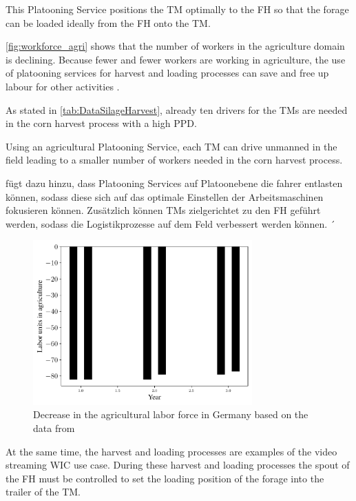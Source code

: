 This Platooning Service positions the \ac{TM} optimally to the \ac{FH} so that the forage can be loaded ideally from the \ac{FH} onto the \ac{TM}.


\autoref{fig:workforce_agri} shows that the number of workers in the agriculture domain is declining.  
Because fewer and fewer workers are working in agriculture, the use of platooning services for harvest and loading processes can save and free up labour for other activities \cite{liu_automation_2022}.

As stated in \autoref{tab:DataSilageHarvest}, already ten drivers for the \ac{TM}s are needed in the corn harvest process with a high \ac{PPD}. 

Using an agricultural Platooning Service, each \ac{TM} can drive unmanned in the field leading to a smaller number of workers needed in the corn harvest process.

\textcite{IVAN} fügt dazu hinzu, dass Platooning Services auf Platoonebene die fahrer entlasten können, sodass diese sich auf das optimale Einstellen der Arbeitsmaschinen fokusieren können. Zusätzlich können \ac{TM}s zielgerichtet zu den \ac{FH} geführt werden, sodass die Logistikprozesse auf dem Feld verbessert werden können. ´

\begin{figure}%
	\centering
	\includegraphics[width=0.75\textwidth]{figures/WorkForceAgriculture.pdf}
	\caption{Decrease in the agricultural labor force in Germany based on the data from \cite{bmel2020}}%
	\label{fig:workforce_agri}%
\end{figure}


At the same time, the harvest and loading processes are examples of the video streaming \ac{WIC} use case. During these harvest and loading processes the spout of the \ac{FH} must be controlled to set the loading position of the forage into the trailer of the \ac{TM}.

